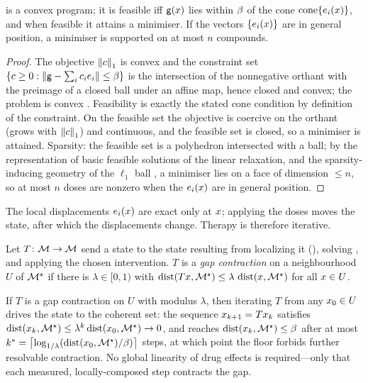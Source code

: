 \begin{proposition}
\label{cfc:prop:closure-wellposed}
 is a convex program; it is feasible iff $\mathsf{g}(x)$ lies
within $\beta$ of the cone $\operatorname{cone}\{e_i(x)\}$, and when feasible
it attains a minimiser. If the vectors $\{e_i(x)\}$ are in general position,
a minimiser is supported on at most $n$ compounds.
\end{proposition}

\begin{proof}
The objective $\norm{c}_1$ is convex and the constraint set
$\{c\ge0:\norm{\mathsf{g}-\sum_i c_i e_i}\le\beta\}$ is the intersection of
the nonnegative orthant with the preimage of a closed ball under an affine map,
hence closed and convex; the problem is convex
\citep{boyd2004convex}. Feasibility is exactly the stated cone condition by
definition of the constraint. On the feasible set the objective is coercive on
the orthant (grows with $\norm{c}_1$) and continuous, and the feasible set
is closed, so a minimiser is attained. Sparsity: the feasible set is a
polyhedron intersected with a ball; by the representation of basic feasible
solutions of the linear relaxation, and the sparsity-inducing geometry of the
$\ell_1$ ball \citep{tibshirani1996lasso,candes2006robust}, a minimiser lies on
a face of dimension $\le n$, so at most $n$ doses are nonzero when the
$e_i(x)$ are in general position.
\end{proof}

The local displacements $e_i(x)$ are exact only at $x$; applying the doses
moves the state, after which the displacements change. Therapy is therefore
iterative.

\begin{definition}
\label{cfc:def:contraction}
Let $T\colon\mathcal{M}\to\mathcal{M}$ send a state to the state resulting from localizing
it (), solving , and applying the chosen
intervention. $T$ is a \emph{gap contraction} on a neighbourhood $U$ of $\mathcal{M}^{\star}$
if there is $\lambda\in[0,1)$ with $\operatorname{dist}(Tx,\mathcal{M}^{\star})\le\lambda\,\operatorname{dist}(x,\mathcal{M}^{\star})$
for all $x\in U$.
\end{definition}

\begin{theorem}
\label{cfc:thm:convergence}
If $T$ is a gap contraction on $U$ with modulus $\lambda$, then iterating $T$
from any $x_0\in U$ drives the state to the coherent set: the sequence
$x_{k+1}=Tx_k$ satisfies
$\operatorname{dist}(x_k,\mathcal{M}^{\star})\le\lambda^{k}\operatorname{dist}(x_0,\mathcal{M}^{\star})\to0$, and reaches
$\operatorname{dist}(x_k,\mathcal{M}^{\star})\le\beta$ after at most
$k^{\ast}=\bigl\lceil\log_{1/\lambda}(\operatorname{dist}(x_0,\mathcal{M}^{\star})/\beta)\bigr\rceil$
steps, at which point the floor forbids further resolvable contraction. No
global linearity of drug effects is required---only that each measured,
locally-composed step contracts the gap.
\end{theorem}

